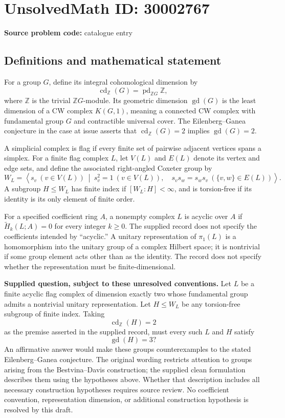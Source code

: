 \documentclass[11pt]{article}
\newcommand{\Z}{\mathbb{Z}}
\begin{document}
\section*{UnsolvedMath ID: 30002767}
\textbf{Source problem code:} catalogue entry
\subsection{Definitions and mathematical statement}
For a group \(G\), define its integral cohomological dimension by
\[
\operatorname{cd}_{\Z}(G)=\operatorname{pd}_{\Z G}\Z,
\]
where \(\Z\) is the trivial \(\Z G\)-module. Its geometric dimension \(\operatorname{gd}(G)\) is the least dimension of a CW complex \(K(G,1)\), meaning a connected CW complex with fundamental group \(G\) and contractible universal cover. The Eilenberg--Ganea conjecture in the case at issue asserts that \(\operatorname{cd}_{\Z}(G)=2\) implies \(\operatorname{gd}(G)=2\).

A simplicial complex is flag if every finite set of pairwise adjacent vertices spans a simplex. For a finite flag complex \(L\), let \(V(L)\) and \(E(L)\) denote its vertex and edge sets, and define the associated right-angled Coxeter group by
\[
W_L=\left\langle s_v\ (v\in V(L))\ \middle|\ s_v^2=1\ (v\in V(L)),\quad s_vs_w=s_ws_v\ (\{v,w\}\in E(L))\right\rangle.
\]
A subgroup \(H\leq W_L\) has finite index if \([W_L:H]<\infty\), and is torsion-free if its identity is its only element of finite order.

For a specified coefficient ring \(A\), a nonempty complex \(L\) is acyclic over \(A\) if \(\widetilde H_k(L;A)=0\) for every integer \(k\geq 0\). The supplied record does not specify the coefficients intended by ``acyclic.'' A unitary representation of \(\pi_1(L)\) is a homomorphism into the unitary group of a complex Hilbert space; it is nontrivial if some group element acts other than as the identity. The record does not specify whether the representation must be finite-dimensional.

\textbf{Supplied question, subject to these unresolved conventions.} Let \(L\) be a finite acyclic flag complex of dimension exactly two whose fundamental group admits a nontrivial unitary representation. Let \(H\leq W_L\) be any torsion-free subgroup of finite index. Taking
\[
\operatorname{cd}_{\Z}(H)=2
\]
as the premise asserted in the supplied record, must every such \(L\) and \(H\) satisfy
\[
\operatorname{gd}(H)=3?
\]
An affirmative answer would make these groups counterexamples to the stated Eilenberg--Ganea conjecture. The original wording restricts attention to groups arising from the Bestvina--Davis construction; the supplied clean formulation describes them using the hypotheses above. Whether that description includes all necessary construction hypotheses requires source review. No coefficient convention, representation dimension, or additional construction hypothesis is resolved by this draft.
\end{document}
